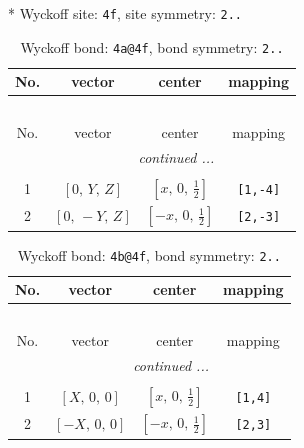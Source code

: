\documentclass[fleqn,8pt]{jsarticle}
\begin{document}
* Wyckoff site: {\tt 4f}, site symmetry: {\tt 2..}
\renewcommand{\arraystretch}{1.2}
\begin{longtable}{cccc}
\caption{Wyckoff bond: {\tt 4a@4f}, bond symmetry: {\tt 2..}}
 \\
 \hline \hline
No. & vector & center & mapping \\ \hline \endfirsthead

\multicolumn{3}{l}{\tablename\ \thetable{}} \\
 \hline \hline
No. & vector & center & mapping \\ \hline \endhead

 \hline \hline
\multicolumn{3}{r}{\footnotesize\it continued ...} \\ \endfoot

 \hline \hline
\multicolumn{3}{r}{} \\ \endlastfoot

1 & $\left[ 0,\, Y,\, Z \right]$ & $\left[ x,\, 0,\, \frac{1}{2} \right]$ & {\tt [1,-4]} \\ \hline
2 & $\left[ 0,\, - Y,\, Z \right]$ & $\left[ - x,\, 0,\, \frac{1}{2} \right]$ & {\tt [2,-3]} \\
\end{longtable}
\renewcommand{\arraystretch}{1.2}
\begin{longtable}{cccc}
\caption{Wyckoff bond: {\tt 4b@4f}, bond symmetry: {\tt 2..}}
 \\
 \hline \hline
No. & vector & center & mapping \\ \hline \endfirsthead

\multicolumn{3}{l}{\tablename\ \thetable{}} \\
 \hline \hline
No. & vector & center & mapping \\ \hline \endhead

 \hline \hline
\multicolumn{3}{r}{\footnotesize\it continued ...} \\ \endfoot

 \hline \hline
\multicolumn{3}{r}{} \\ \endlastfoot

1 & $\left[ X,\, 0,\, 0 \right]$ & $\left[ x,\, 0,\, \frac{1}{2} \right]$ & {\tt [1,4]} \\ \hline
2 & $\left[ - X,\, 0,\, 0 \right]$ & $\left[ - x,\, 0,\, \frac{1}{2} \right]$ & {\tt [2,3]} \\
\end{longtable}
\renewcommand{\arraystretch}{1.2}
\end{document}
